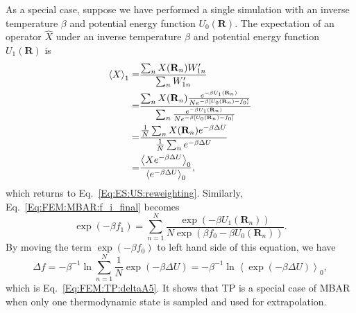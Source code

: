 As a special case, suppose we have performed a single simulation with an inverse temperature $\beta$ and potential energy function $U_0(\mathbf{R})$. The expectation of an operator $\hat{X}$ under an inverse temperature $\beta$ and potential energy function $U_1(\mathbf{R})$ is
\begin{align}
	\left<X\right>_1=&\frac{\sum_n X(\mathbf{R}_n)W_{1n}^\prime}{\sum_n W_{1n}^\prime}\notag\\
	                =&\frac{\sum_n X(\mathbf{R}_n)\frac{e^{-\beta U_1(\mathbf{R}_n)}}{N e^{-\beta \left[U_0(\mathbf{R}_n)-f_0\right]}}}{\sum_n \frac{e^{-\beta U_1(\mathbf{R}_n)}}{N e^{-\beta \left[U_0(\mathbf{R}_n)-f_0\right]}}}\notag\\
	                =&\frac{\frac1N\sum_n X(\mathbf{R}_n)e^{-\beta \Delta U}}{\frac1N\sum_n e^{-\beta \Delta U}}\notag\\
	                =&\frac{\left<Xe^{-\beta \Delta U}\right>_0}{\left<e^{-\beta \Delta U}\right>_0},
\end{align}
which returns to Eq.~\ref{Eq:ES:US:reweighting}. Similarly, Eq.~\ref{Eq:FEM:MBAR:f_i_final} becomes
\begin{equation}
    \exp{(-\beta f_1)}=\sum\limits_{n=1}^N \frac{\exp{\left(-\beta U_1(\mathbf{R}_n)\right)}}{N\exp{\left(\beta f_0-\beta U_0(\mathbf{R}_n)\right)}}.
\end{equation}
By moving the term $\exp{(-\beta f_0)}$ to left hand side of this equation, we have
\begin{equation}
    \Delta f=-\beta^{-1}\ln{\sum\limits_{n=1}^N\frac{1}{N}\exp{(-\beta \Delta U)}}=-\beta^{-1}\ln{\left<\exp{(-\beta \Delta U)}\right>_0},
\end{equation}
which is Eq.~\ref{Eq:FEM:TP:deltaA5}. It shows that TP is a special case of MBAR when only one thermodynamic state is sampled and used for extrapolation.

